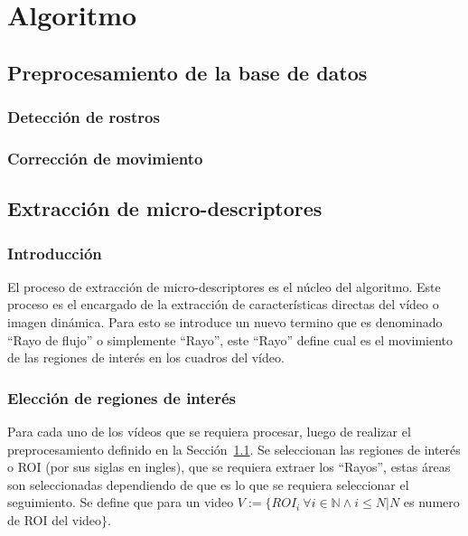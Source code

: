 \chapter[Algoritmo]{Algoritmo}
\label{ch:algoritmo}

\section{Preprocesamiento de la base de datos}
\label{sec:proc_bdd}
	\subsection{Detección de rostros}
	\label{algoritmo:det_rostro}
	
	\subsection{Corrección de movimiento}
	\label{algoritmo:cor_movimiento}

\section{Extracción de micro-descriptores}
\label{sec:micro-descriptores}
	\subsection{Introducción}
	\label{algoritmo:extr_intro}
		El proceso de extracción de micro-descriptores es el núcleo del algoritmo. Este proceso es el encargado de la extracción de características directas del vídeo o imagen dinámica. Para esto se introduce un nuevo termino que es denominado ``Rayo de flujo'' o simplemente ``Rayo'', este ``Rayo'' define cual es el movimiento de las regiones de interés en los cuadros del vídeo.

	\subsection{Elección de regiones de interés}
	\label{algoritmo:elecc_roi}
	Para cada uno de los vídeos que se requiera procesar, luego de realizar el preprocesamiento definido en la Sección~\ref{sec:proc_bdd}. Se seleccionan las regiones de interés o ROI (por sus siglas en ingles), que se requiera extraer los ``Rayos'', estas áreas son seleccionadas dependiendo de que es lo que se requiera seleccionar el seguimiento. Se define que para un video $V := \{ROI_i~\forall i \in \mathds{N} \land i \le N | N$ es numero de ROI del video$\}$. 
	
